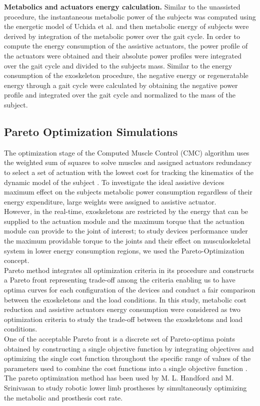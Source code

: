 \documentclass[10pt,letterpaper]{article}
\begin{document}
\vspace{5mm}
\textbf{Metabolics and actuators energy calculation.} Similar to the unassisted procedure, the instantaneous metabolic power of the subjects was computed using the energetic model of Uchida et al. \cite{106} and then metabolic energy of subjects were derived by integration of the metabolic power over the gait cycle. In order to compute the energy consumption of the assistive actuators, the power profile of the actuators were obtained and their absolute power profiles were integrated over the gait cycle and divided to the subjects mass. Similar to the energy consumption of the exoskeleton procedure, the negative energy or regeneratable energy through a gait cycle were calculated by obtaining the negative power profile and integrated over the gait cycle and normalized to the mass of the subject.\\
\subsection*{Pareto Optimization Simulations}
The optimization stage of the Computed Muscle Control (CMC) algorithm uses the weighted sum of squares to solve muscles and assigned actuators redundancy to select a set of actuation with the lowest cost for tracking the kinematics of the dynamic model of the subject \cite{92}. To investigate the ideal assistive devices maximum effect on the subjects metabolic power consumption regardless of their energy expenditure, large weights were assigned to assistive actuator.\\
However, in the real-time, exoskeletons are restricted by the energy that can be supplied to the actuation module and the maximum torque that the actuation module can provide to the joint of interest; to study devices performance under the maximum providable torque to the joints and their effect on musculoskeletal system in lower energy consumption regions, we used the Pareto-Optimization concept\cite{113}.\\
Pareto method integrates all optimization criteria in its procedure and constructs a Pareto front representing trade-off among the criteria enabling us to have optima curves for each configuration of the devices \cite{107} and conduct a fair comparison between the exoskeletons and the load conditions. In this study, metabolic cost reduction and assistive actuators energy consumption were considered as two optimization criteria to study the trade-off between the exoskeletons and load conditions.\\
One of the acceptable Pareto front is a discrete set of Pareto-optima points obtained by constructing a single objective function by integrating objectives and optimizing the single cost function throughout the specific range of values of the parameters used to combine the cost functions into a single objective function \cite{108}.\\
The pareto optimization method has been used by M. L. Handford and M. Srinivasan\cite{111,127} to study robotic lower limb prostheses by simultaneously optimizing the metabolic and prosthesis cost rate. \\
\end{document}
